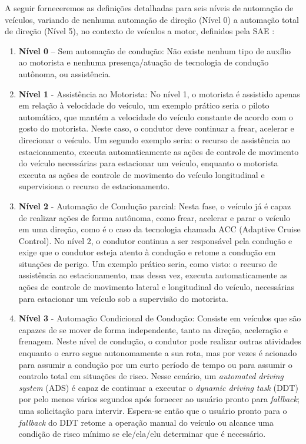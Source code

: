 A seguir forneceremos as definições detalhadas para seis níveis de automação de veículos, variando de nenhuma automação de direção (Nível 0) a automação total de direção (Nível 5), no contexto de veículos a motor, definidos pela SAE \cite{SAE}:

\begin{enumerate}
 \item \textbf{Nível 0} – Sem automação de condução: Não existe nenhum tipo de auxílio ao motorista e nenhuma presença/atuação de tecnologia de condução autônoma, ou assistência.

\item \textbf{Nível 1} - Assistência ao Motorista: No nível 1, o motorista é assistido apenas em relação à velocidade do veículo, um exemplo prático seria o piloto automático, que mantém a velocidade do veículo constante de acordo com o gosto do motorista. Neste caso, o condutor deve continuar a frear, acelerar e direcionar o veículo. Um segundo exemplo seria: o recurso de assistência ao estacionamento, executa automaticamente as ações de controle de movimento do veículo necessárias para estacionar um veículo, enquanto o motorista executa as ações de controle de movimento do veículo longitudinal e supervisiona o recurso de estacionamento.

\item \textbf{Nível 2} - Automação de Condução parcial: Nesta fase, o veículo já é capaz de realizar ações de forma autônoma, como frear, acelerar e parar o veículo em uma direção, como é o caso da tecnologia chamada ACC (Adaptive Cruise Control). No nível 2, o condutor continua a ser responsável pela condução e exige que o condutor esteja atento à condução e retome a condução em situações de perigo. Um exemplo prático seria, como visto: o recurso de assistência ao estacionamento, mas dessa vez, executa automaticamente as ações de controle de movimento lateral e longitudinal do veículo, necessárias para estacionar um veículo sob a supervisão do motorista.

\item \textbf{Nível 3} - Automação Condicional de Condução: Consiste em veículos que são capazes de se mover de forma independente, tanto na direção, aceleração e frenagem. Neste nível de condução, o condutor pode realizar outras atividades enquanto o carro segue autonomamente a sua rota, mas por vezes é acionado para assumir a condução por um curto período de tempo ou para assumir o controlo total em situações de risco. Nesse cenário, um \textit{automated driving system} (ADS)  é capaz de continuar a executar o \textit{dynamic driving task} (DDT) por pelo menos vários segundos após fornecer ao usuário pronto para \textit{fallback}; uma solicitação para intervir. Espera-se então que o usuário pronto para o \textit{fallback} do DDT retome a operação manual do veículo ou alcance uma condição de risco mínimo se ele/ela/elu determinar que é necessário.


\end{enumerate}
